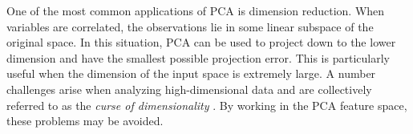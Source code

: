 One of the most common applications of PCA is dimension reduction.
When variables are correlated, the observations lie in some linear subspace of the original space.
In this situation, PCA can be used to project down to the lower dimension and have the smallest possible projection error.
This is particularly useful when the dimension of the input space is extremely large.
A number challenges arise when analyzing high-dimensional data and are collectively referred to as the \textit{curse of dimensionality} \cite{koutroumbas2008pattern}.
By working in the PCA feature space, these problems may be avoided.

\begin{example}
    \label{eg:pca-code}
    
\end{example}